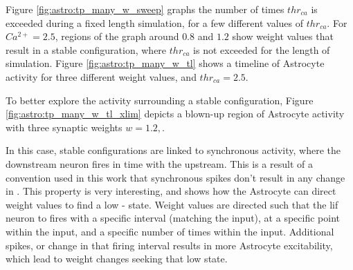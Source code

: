 
Figure \ref{fig:astro:tp_many_w_sweep} graphs the number of times $thr_{ca}$ is
exceeded during a fixed length simulation, for a few different values of
$thr_{ca}$. For $Ca^{2+}=2.5$, regions of the graph around $0.8$ and $1.2$ show
weight values that result in a stable configuration, where $thr_{ca}$ is not
exceeded for the length of simulation. Figure \ref{fig:astro:tp_many_w_tl} shows
a timeline of Astrocyte activity for three different weight values, and
$thr_{ca}=2.5$.




To better explore the activity surrounding a stable configuration, Figure
\ref{fig:astro:tp_many_w_tl_xlim} depicts a blown-up region of Astrocyte activity
with three synaptic weights $w=1.2,$.

In this case, stable configurations are linked to synchronous activity, where the
downstream neuron fires in time with the upstream. This is a result of a
convention used in this work that synchronous spikes don't result in any change
in \ca. This property is very interesting, and shows how the Astrocyte can
direct weight values to find a low - \ca state. Weight values are directed such
that the \Gls{lif} neuron to fires with a specific interval (matching the input), at a
specific point within the input, and a specific number of times within the
input. Additional spikes, or change in that firing interval results in more
Astrocyte excitability, which lead to weight changes seeking that low \ca
state.



